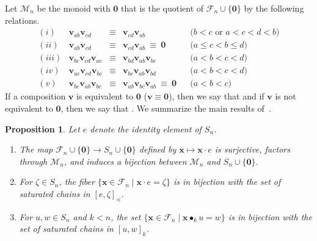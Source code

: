 \documentclass[12pt,oneside,reqno]{amsart}
\newtheorem{proposition}[theorem]{Proposition}
\theoremstyle{definition}
\numberwithin{equation}{section}
\newcommand{\calF}{{\mathcal F}}
\newcommand{\calM}{{\mathcal M}}
\newcommand{\qv}{{\mathbf v}}
\newcommand{\bzero}{{\mathbf 0}}
\newcommand{\bx}{{\mathbf x}}
\DeclareMathOperator{\kactionop}{{\scriptstyle \bullet}}
\newcommand{\kaction}[1][k]{\kactionop_{#1}}
\newcommand{\defcolor}[1]{{\color{RoyalBlue}#1}}
\newcommand{\demph}[1]{\defcolor{{\sl #1}}}
\begin{document}
Let \defcolor{$\calM_n$} be the monoid with $\bzero$ that is the quotient of $\calF_n\cup\{\bzero\}$ by the
following relations.
%
\begin{equation}
    \label{Eq:monoid-relations}
    \begin{array}{rrclll}
        (i)   & \qv_{ab}\qv_{cd}           & \equiv & \qv_{cd}\qv_{ab}                     &  & \text{($b<c$ or $a<c<d<b$)} \\ [0.5ex]
        (ii)  & \qv_{ab}\qv_{cd}           & \equiv & \qv_{cd}\qv_{ab}\ \equiv\ \bzero     &  & \text{($a\leq c<b\leq d$)}  \\ [0.5ex]
        (iii) & \qv_{bc}\qv_{cd}\qv_{ac} & \equiv & \qv_{bd}\qv_{ab}\qv_{bc}                 &  & \text{($a<b<c<d$)}          \\ [0.5ex]
        (iv)  & \qv_{ac}\qv_{cd}\qv_{bc} & \equiv & \qv_{bc}\qv_{ab}\qv_{bd}                 &  & \text{($a<b<c<d$)}          \\ [0.5ex]
        (v)   & \qv_{bc}\qv_{ab}\qv_{bc} & \equiv & \qv_{ab}\qv_{bc}\qv_{ab}\ \equiv\ \bzero &  & \text{($a<b<c$)}
    \end{array}
\end{equation}
%
If a composition  $\qv$ is equivalent to $\bzero$ ($\qv\equiv\bzero$), then we say that \demph{$\qv$ is zero} and
if $\qv$ is not equivalent to $\bzero$, then we say that \demph{$\qv$ is nonzero}.
We summarize the main results of~\cite{BS-Monoid}.

\begin{proposition}\label{Prop:monoid}
    Let $e$ denote the identity element of $S_n$.
    \begin{enumerate}
        \item
            The map $\calF_n\cup\{\bzero\}\to S_n\cup\{\bzero\}$ defined by
            $\bx\mapsto \bx \cdot e$ is surjective, factors through $\calM_n$,
            and induces a bijection between $\calM_n$ and $S_n \cup \{\bzero\}$.
        \item
            For $\zeta\in S_n$, the fiber $\{\bx\in\calF_n\mid \bx \cdot
            e = \zeta\}$ is in bijection with the set of saturated chains in
            $[e,\zeta]_\preceq$.
        \item\label{Prop_3}
            For $u,w\in S_n$ and $k<n$, the set $\{ \bx\in\calF_n\mid \bx\kaction u=w\}$ is
            in bijection with the set of saturated chains in $[u,w]_k$.
    \end{enumerate}
\end{proposition}
\end{document}
